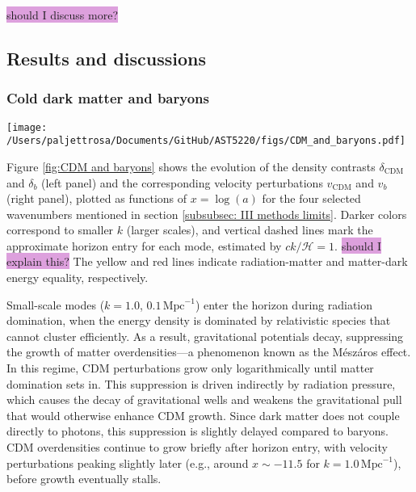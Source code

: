 \documentclass{aa}
\numberwithin{equation}{section}
\numberwithin{table}{section}
\numberwithin{figure}{section}
\begin{document}
\colorbox{Plum}{should I discuss more?}



\subsection{Results and discussions}\label{subsec: III results}

\subsubsection{Cold dark matter and baryons}\label{subsubsec: III results CDM and baryons}

\begin{figure*}
  \centering
  \texttt{[image: /Users/paljettrosa/Documents/GitHub/AST5220/figs/CDM\_and\_baryons.pdf]}
  \caption{Evolution of the CDM (purple shades) and baryon (orange shades) density (left) and velocity (right) perturbations. Darker lines correspond to larger scales (smaller $k$, given in units of $\text{Mpc}^{-1}$). An asinh-scaling is used to highlight variations across several orders of magnitude and sign changes. Dashed lines indicate approximate horizon entry times for different modes, while the yellow and red vertical lines mark radiation-matter and matter-dark energy equality, respectively. \colorbox{Plum}{should I explain the asinh scaling?}}\label{fig:CDM and baryons}
\end{figure*}

Figure \ref{fig:CDM and baryons} shows the evolution of the density contrasts $\delta_\text{CDM}$ and $\delta_b$ (left panel) and the corresponding velocity perturbations $v_\text{CDM}$ and $v_b$ (right panel), plotted as functions of $x = \log (a)$ for the four selected wavenumbers mentioned in section \ref{subsubsec: III methods limits}. Darker colors correspond to smaller $k$ (larger scales), and vertical dashed lines mark the approximate horizon entry for each mode, estimated by $ck/\mathcal{H} = 1$. \colorbox{Plum}{should I explain this?} The yellow and red lines indicate radiation-matter and matter-dark energy equality, respectively.

Small-scale modes ($k = 1.0$, $0.1\,\text{Mpc}^{-1}$) enter the horizon during radiation domination, when the energy density is dominated by relativistic species that cannot cluster efficiently. As a result, gravitational potentials decay, suppressing the growth of matter overdensities—a phenomenon known as the Mészáros effect. In this regime, CDM perturbations grow only logarithmically until matter domination sets in. This suppression is driven indirectly by radiation pressure, which causes the decay of gravitational wells and weakens the gravitational pull that would otherwise enhance CDM growth. Since dark matter does not couple directly to photons, this suppression is slightly delayed compared to baryons. CDM overdensities continue to grow briefly after horizon entry, with velocity perturbations peaking slightly later (e.g., around $x \sim -11.5$ for $k = 1.0\,\text{Mpc}^{-1}$), before growth eventually stalls.
\end{document}
